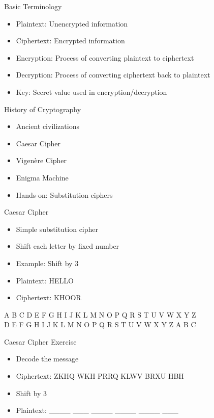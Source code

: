 \begin{withoutheadline}
\begin{frame}{Basic Terminology}
\begin{itemize}
    \item Plaintext: Unencrypted information
    \item Ciphertext: Encrypted information
    \item Encryption: Process of converting plaintext to ciphertext
    \item Decryption: Process of converting ciphertext back to plaintext
    \item Key: Secret value used in encryption/decryption
\end{itemize}
\end{frame}

\begin{frame}{History of Cryptography}
\begin{itemize}
    \item Ancient civilizations
    \item Caesar Cipher
    \item Vigenère Cipher
    \item Enigma Machine
    \item Hands-on: Substitution ciphers
\end{itemize}
\end{frame}

\begin{frame}{Caesar Cipher}
\begin{itemize}
    \item Simple substitution cipher
    \item Shift each letter by fixed number
    \item Example: Shift by 3
    \item Plaintext: HELLO
    \item Ciphertext: KHOOR
\end{itemize}
A B C D E F G H I J K L M N O P Q R S T U V W X Y Z \\
D E F G H I J K L M N O P Q R S T U V W X Y Z A B C \\
\end{frame}

\begin{frame}{Caesar Cipher Exercise}
\begin{itemize}
    \item Decode the message
    \item Ciphertext: ZKHQ WKH PRRQ KLWV BRXU HBH
    \item Shift by 3
    \item Plaintext:  \_\_\_\_ \_\_\_ \_\_\_\_ \_\_\_\_ \_\_\_\_ \_\_\_
\end{itemize}
\end{frame}


\end{withoutheadline}
